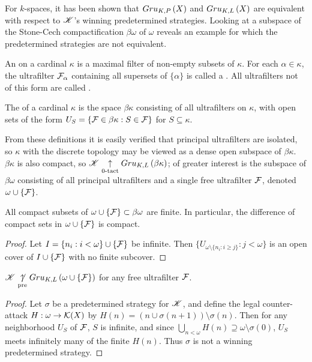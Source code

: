 For $k$-spaces, it has been shown that $Gru_{K,P}\left({X}\right)$ and $Gru_{K,L}\left({X}\right)$
are equivalent with respect to $\mathscr{K}$'s winning predetermined strategies.
Looking at a subspace of the Stone-Cech compactification $\beta\omega$ of
$\omega$ reveals an example for which the predetermined strategies are not
equivalent.

\begin{defn}
  An  on a cardinal $\kappa$ is a maximal filter of non-empty
  subsets of $\kappa$. For each $\alpha\in \kappa$, the ultrafilter
  $\mathcal{F}_\alpha$ containing all supersets of $\{\alpha\}$ is called a
  . All
  ultrafilters not of this form are called .
\end{defn}

\begin{defn}
  The  of a cardinal
  $\kappa$ is the space $\beta\kappa$ consisting
  of all ultrafilters on $\kappa$, with open sets of the form
  $U_S=\{\mathcal{F}\in\beta\kappa : S\in\mathcal{F}\}$ for $S\subseteq \kappa$.
\end{defn}

From these definitions it is easily verified that principal ultrafilters
are isolated, so $\kappa$ with the discrete topology may be viewed as
a dense open subspace of $\beta\kappa$. $\beta\kappa$ is also compact, so
$\mathscr{K}\underset{0\text{-tact}}{\uparrow}Gru_{K,L}\left({\beta\kappa}\right)$; of greater interest is the subspace
of $\beta\omega$ consisting of all principal ultrafilters and a single free
ultrafilter $\mathcal{F}$, denoted $\omega\cup\{\mathcal{F}\}$.

\begin{lem}
  All compact subsets of $\omega\cup\{\mathcal{F}\}\subset\beta\omega$ are finite.
  In particular, the difference of compact sets in $\omega\cup\{\mathcal{F}\}$
  is compact.
\end{lem}

\begin{proof}
  Let $I=\{n_i:i<\omega\}\cup\{\mathcal{F}\}$ be infinite.
  Then $\{U_{\omega\setminus\{n_i:i\geq j\}}:j<\omega\}$ is an open cover of
  $I\cup\{\mathcal{F}\}$ with no finite subcover.
\end{proof}

\begin{thm}
  $\mathscr{K}\underset{\text{pre}}{\not\uparrow} Gru_{K,L}\left({\omega\cup\{\mathcal{F}\}}\right)$ for any free
  ultrafilter $\mathcal{F}$.
\end{thm}

\begin{proof}
  Let $\sigma$ be a predetermined strategy for $\mathscr{K}$, and define the legal
  counter-attack $H:\omega\to\mathcal{K}(X)$ by
  $H(n)=(n\cup\sigma(n+1))\setminus\sigma(n)$. Then for any neighborhood
  $U_S$ of $\mathcal{F}$, $S$ is infinite, and since
  $\bigcup_{n<\omega} H(n)\supseteq\omega\setminus\sigma(0)$, $U_S$ meets
  infinitely many of the finite $H(n)$. Thus $\sigma$ is not a winning
  predetermined strategy.
\end{proof}

